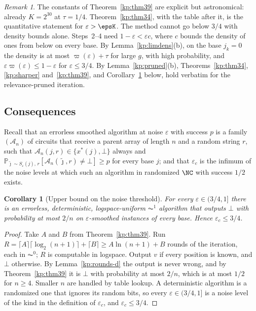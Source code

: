 \documentclass[11pt]{amsart}
\newtheorem{corollary}[theorem]{Corollary}
\theoremstyle{definition}
\theoremstyle{remark}
\newtheorem{remark}[theorem]{Remark}
\newcommand{\eps}{\varepsilon}
\newcommand{\jt}{\tilde{\jmath}}
\newcommand{\PP}{\mathbb{P}}
\begin{document}
\begin{remark}\label{kp:rem-limits}
The constants of Theorem~\ref{kp:thm39} are explicit but astronomical: already
$K=2^{30}$ at $\tau=1/4$. Theorem~\ref{kp:thm34}, with the table after it, is
the quantitative statement for $\eps>\epsK$. The method cannot go below $3/4$
with density bounds alone. Steps~2--4 need $1-\eps<\eps c$, where $c$ bounds the
density of ones from below on every base. By Lemma~\ref{kp:limdens}(b), on the
base $j_k=0$ the density is at most $\varpi(\eps)+\tau$ for large $g$, with high
probability, and $\eps\varpi(\eps)\le 1-\eps$ for $\eps\le 3/4$. By
Lemma~\ref{kp:pruned}(b), Theorems~\ref{kp:thm34}, \ref{kp:sharper}
and~\ref{kp:thm39}, and Corollary~\ref{kp:cor315} below, hold verbatim for the
relevance-pruned iteration.
\end{remark}

\subsection{Consequences}\label{kp:sub-cons}

Recall that an errorless smoothed algorithm at noise $\eps$ with success $p$ is
a family $(\mathcal A_n)$ of circuits that receive a parent array of length $n$
and a random string $r$, such that $\mathcal A_n(j,r)\in\{x^*(j),\bot\}$ always
and $\PP_{\jt\sim S_\eps(j),\,r}[\mathcal A_n(\jt,r)\ne\bot]\ge p$ for every
base $j$; and that $\eps_c$ is the infimum of the noise levels at which such an
algorithm in randomized $\NC$ with success $1/2$ exists.

\begin{corollary}[Upper bound on the noise threshold]\label{kp:cor315}
For every $\eps\in(3/4,1]$ there is an errorless, deterministic,
logspace-uniform $\AC^1$ algorithm that outputs $\bot$ with probability at most
$2/n$ on $\eps$-smoothed instances of every base. Hence $\eps_c\le 3/4$.
\end{corollary}

\begin{proof}
Take $A$ and $B$ from Theorem~\ref{kp:thm39}. Run
$R=\lceil A\rceil\lceil\log_2(n+1)\rceil+\lceil B\rceil\ge A\ln(n+1)+B$ rounds
of the iteration, each in $\AC^0$; $R$ is computable in logspace. Output $v$ if
every position is known, and $\bot$ otherwise. By Lemma~\ref{kp:rounds-d} the
output is never wrong, and by Theorem~\ref{kp:thm39} it is $\bot$ with
probability at most $2/n$, which is at most $1/2$ for $n\ge 4$. Smaller $n$ are
handled by table lookup. A deterministic algorithm is a randomized one that
ignores its random bits, so every $\eps\in(3/4,1]$ is a noise level of the kind
in the definition of $\eps_c$, and $\eps_c\le 3/4$.
\end{proof}
\end{document}
